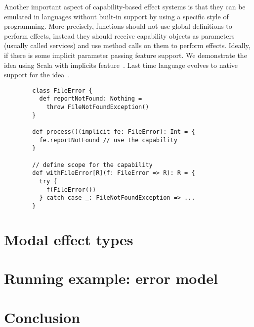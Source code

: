 \documentclass[conference]{IEEEtran}
\begin{document}
    Another important aspect of capability-based effect systems is that they can be emulated in languages without built-in support by using a specific style of programming.
    More precisely, functions should not use global definitions to perform effects, instead they should receive capability objects as parameters (usually called services) and use method calls on them to perform effects.
    Ideally, if there is some implicit parameter passing feature support.
    We demonstrate the idea using Scala with implicits feature~\cite{odersky2004scala}.
    Last time language evolves to native support for the idea~\cite{odersky2021safer}.
    \begin{verbatim}
        class FileError {
          def reportNotFound: Nothing =
            throw FileNotFoundException()
        }

        def process()(implicit fe: FileError): Int = {
          fe.reportNotFound // use the capability
        }

        // define scope for the capability
        def withFileError[R](f: FileError => R): R = {
          try {
            f(FileError())
          } catch case _: FileNotFoundException => ...
        }
    \end{verbatim}






    \section{Modal effect types} \label{sec:modal}



    \section{Running example: error model}



    \section{Conclusion}



%



    
    
\end{document}

